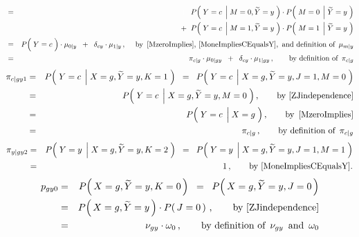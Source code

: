 \begin{enumerate}
\begin{eqnarray*}
\\
&=&
	{\color{white}+}\;\;
	P\!\left(\;Y=c\;\left\vert\;M=0,\widetilde{Y}=y\right.\,\right)
	\cdot
	P\!\left(\;M=0\;\left\vert\;\widetilde{Y}=y\right.\,\right)
\\
&&
	+\;\;
	P\!\left(\;Y=c\;\left\vert\;M=1,\widetilde{Y}=y\right.\,\right)
	\cdot
	P\!\left(\;M=1\;\left\vert\;\widetilde{Y}=y\right.\,\right)
\\
&=&
	P\!\left(\;Y\overset{{\color{white}-}}{=}c\;\right)
	\cdot
	\mu_{0 \vert y}
	\;\;+\;\;
	\delta_{cy}
	\cdot
	\mu_{1 \vert y}\,,
	\quad\;
	\textnormal{by \,\eqref{MzeroImplies}, \eqref{MoneImpliesCEqualsY},\, and definition of \,$\mu_{m \vert y}$}
\\
&=&
	\pi_{c \vert g}
	\cdot
	\mu_{0 \vert gy}
	\;\;+\;\;
	\delta_{cy}
	\cdot
	\mu_{1 \vert gy}\,,
	\quad\quad
	\textnormal{by definition of \,$\pi_{c \vert g}$}
\end{eqnarray*}
\begin{eqnarray*}
\pi_{c \vert gy1}
&=&
	P\!\left(\;Y=c\;\left\vert\;X=g,\widetilde{Y}=y,K=1\right.\,\right)
\;\;=\;\;
	P\!\left(\;Y=c\;\left\vert\;X=g,\widetilde{Y}=y,J=1,M=0\right.\,\right)
\\
&=&
	P\!\left(\;Y=c\;\left\vert\;X=g,\widetilde{Y}=y,M=0\right.\,\right),
	\quad\quad
	\textnormal{by \eqref{ZJindependence}}
\\
&=&
	P\!\left(\;Y=c\;\left\vert\;X\overset{{\color{white}-}}{=}g\right.\,\right),
	\quad\quad
	\textnormal{by \,\eqref{MzeroImplies}}
\\
&=&
	\pi_{c \vert g}\,,
	\quad\quad
	\textnormal{by definition of \,$\pi_{c \vert g}$}
\end{eqnarray*}
\begin{eqnarray*}
\pi_{y \vert gy2}
&=&
	P\!\left(\;Y=y\;\left\vert\;X=g,\widetilde{Y}=y,K=2\right.\,\right)
\;\;=\;\;
	P\!\left(\;Y=y\;\left\vert\;X=g,\widetilde{Y}=y,J=1,M=1\right.\,\right)
\\
&=&
	1\,,
	\quad\quad
	\textnormal{by \eqref{MoneImpliesCEqualsY}.}
\end{eqnarray*}
\begin{eqnarray*}
p_{gy0}
&=&
	P\!\left(\,X=g,\widetilde{Y}=y,K=0\,\right)
\;\;=\;\;
	P\!\left(\,X=g,\widetilde{Y}=y,J=0\,\right)
\\
&=&
	P\!\left(\,X=g,\widetilde{Y}=y\,\right)
	\cdot
	P\!\left(\,J=0\,\right)\,,
	\quad\quad
	\textnormal{by \eqref{ZJindependence}}
\\
&=&
	\nu_{gy}
	\cdot
	\omega_{0}\,,
	\quad\quad
	\textnormal{by definition of \,$\nu_{gy}$\, and \,$\omega_{0}$}

\end{eqnarray*}
\end{enumerate}
